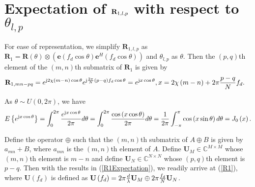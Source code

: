 \documentclass[12pt, draftclsnofoot, onecolumn]{IEEEtran}
\begin{document}
\section{Expectation of ${\bf R}_{1,l,p}$ with respect to ${\theta }_{l,p}$}{\label{Expectation}}
For ease of representation, we simplify ${{\mathbf{R}}_{1,l,p}}$ as ${{\mathbf{R}}_{1}}=\mathbf{R}\left( \theta  \right)\otimes \left( \mathbf{e}\left( {{f}_{d}}\cos \theta  \right){{\mathbf{e}}^{H}}\left( {{f}_{d}}\cos \theta  \right) \right)$ and $\theta_{l,p}$ as $\theta$. Then the $(p,q)$th element of the $(m,n)$th submatrix of ${{\mathbf{R}}_{1}}$ is given by
\begin{align}
{{\mathbf{R}}_{1, mn-pq}}& ={{e}^{\text{j}2\chi\left( m-n \right)\cos \theta }}{{e}^{\text{j} \frac{2{\rm\pi}}{N}\left( p-q \right){{f}_{d}}\cos \theta }} ={{e}^{\text{j}x\cos \theta }}, x=2\chi\left( m-n \right)+2{\rm\pi} \frac{p-q}{N}{{f}_{d}}.
\end{align}

As $\theta \sim U\left(0,2\pi \right)$, we have
\begin{align}\label{R1Expectation}
  E\left\{ {{e}^{\text{j}x\cos \theta }} \right\} = \int_{0}^{2{\rm\pi}}{{\frac{{e}^{\text{j}x\cos \theta }}{2{\rm\pi}} }d\theta } =\int_{0}^{2{\rm\pi}}{\frac{\cos \left( x\cos \theta  \right)}{2{\rm\pi}} d\theta } = \frac{1}{2{\rm\pi}}\int_{-{\rm\pi}}^{{\rm\pi}}{\cos \left( x\sin \theta  \right)d\theta }={{J}_{0}}\left( x \right).
\end{align}

Define the operator $\oplus $ such that the $\left( m, n \right)$th submatrix of $A\oplus B$ is given by ${{a}_{mn}}+B$, where ${{a}_{mn}}$ is the $(m,n)$th element of $A$. Define ${{\mathbf{U}}_{M}}\in {{\mathbb{C}}^{M\times M}}$ whose $(m,n)$th element is $m-n$ and define ${{\mathbf{U}}_{N}}\in {{\mathbb{C}}^{N\times N}}$ whose $(p,q)$th element is $p-q$. Then with the results in (\ref{R1Expectation}), we readily arrive at (\ref{R1}), where $\mathbf{U}\left( {{f}_{d}} \right)$ is defined as $\mathbf{U}\left( {{f}_{d}} \right) = 2{\rm\pi}\frac{d}{\lambda }{{\mathbf{U}}_{M}} \oplus  2{\rm\pi} \frac{{{f}_{d}}}{N}{{\mathbf{U}}_{N}}$.

\vspace{-0.8em}
\end{document}
